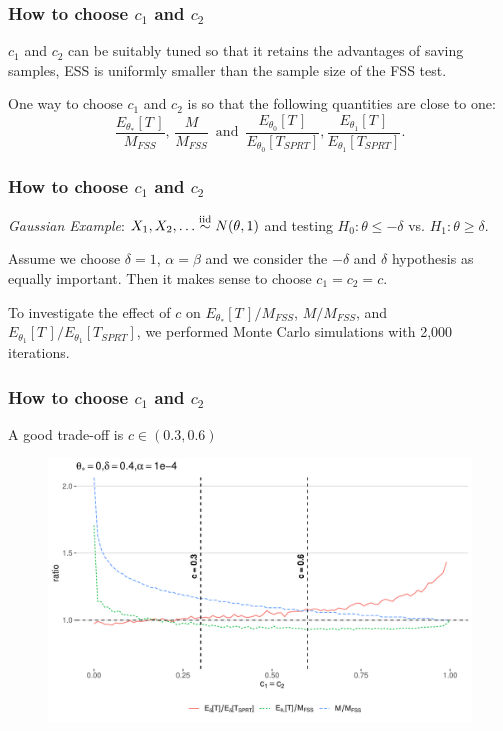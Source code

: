 \documentclass[10pt]{beamer}
\begin{document}
\begin{frame}
\frametitle{How to choose $c_1$ and $c_2$}

$c_1$ and $c_2$ can be suitably tuned so that it retains the advantages of saving samples, ESS is uniformly smaller than the sample size of the FSS test.

One way to choose $c_1$ and $c_2$ is so that the following quantities are close to one:
\[
\frac{E_{\theta_{*}}[T\,]}{M_{FSS}}, \, \frac{M}{M_{FSS}}  \, \text{ and } \, \frac{E_{\theta_0}[T\,]}{E_{\theta_0}[T_{SPRT}]}, \frac{E_{\theta_1}[T\,]}{E_{\theta_1}[T_{SPRT}]}.
\]

\end{frame}

\begin{frame}
\frametitle{How to choose $c_1$ and $c_2$}
\textit{Gaussian Example}: $X_1, X_2, \dots  \overset{\text{iid}}\sim N(\theta, 1)$ and testing $H_0: \theta \leq -\delta$ vs. $H_1: \theta \geq \delta$.

Assume we choose $\delta =1$, $\alpha = \beta$ and we consider the $-\delta$ and $\delta$ hypothesis as equally important. Then it makes sense to choose $c_1 = c_2 = c$.

To investigate the effect of $c$ on $E_{\theta_{*}}[T\,] / M_{FSS}$, $M / M_{FSS}$, and $E_{\theta_1}[T\,] / E_{\theta_1}[T_{SPRT}]$, we performed Monte Carlo simulations with 2,000 iterations.

\end{frame}

\begin{frame}
\frametitle{How to choose $c_1$ and $c_2$}
A good trade-off is $c \in (0.3, 0.6)$

\begin{figure}
\centering
\includegraphics[height=0.7\textheight]{images/c1_c2_ratios}
\end{figure}

\end{frame}
\end{document}
